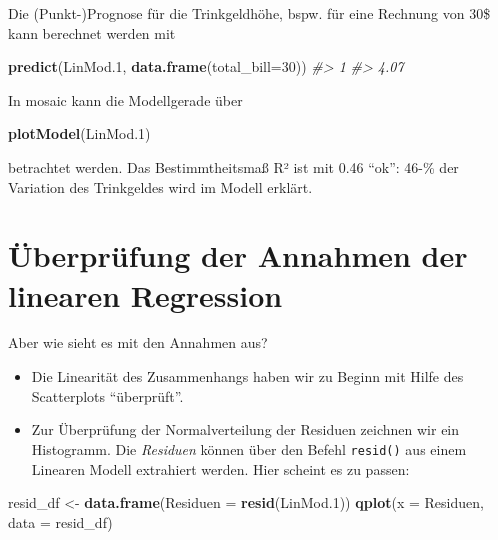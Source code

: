 \documentclass[12pt,ngerman,]{book}
\newenvironment{Shaded}{\begin{snugshade}}{\end{snugshade}}
\newcommand{\KeywordTok}[1]{\textcolor[rgb]{0.13,0.29,0.53}{\textbf{{#1}}}}
\newcommand{\DataTypeTok}[1]{\textcolor[rgb]{0.13,0.29,0.53}{{#1}}}
\newcommand{\DecValTok}[1]{\textcolor[rgb]{0.00,0.00,0.81}{{#1}}}
\newcommand{\FloatTok}[1]{\textcolor[rgb]{0.00,0.00,0.81}{{#1}}}
\newcommand{\StringTok}[1]{\textcolor[rgb]{0.31,0.60,0.02}{{#1}}}
\newcommand{\CommentTok}[1]{\textcolor[rgb]{0.56,0.35,0.01}{\textit{{#1}}}}
\newcommand{\NormalTok}[1]{{#1}}
\providecommand{\tightlist}{%
  \setlength{\itemsep}{0pt}\setlength{\parskip}{0pt}}
\renewenvironment{Shaded}{\begin{kframe}}{\end{kframe}}
\begin{document}
Die (Punkt-)Prognose für die Trinkgeldhöhe, bspw. für eine Rechnung von
30\$ kann berechnet werden mit

\begin{Shaded}
\begin{Highlighting}[]
\KeywordTok{predict}\NormalTok{(LinMod}\FloatTok{.1}\NormalTok{, }\KeywordTok{data.frame}\NormalTok{(}\DataTypeTok{total_bill=}\DecValTok{30}\NormalTok{))}
\CommentTok{#>    1 }
\CommentTok{#> 4.07}
\end{Highlighting}
\end{Shaded}

In mosaic kann die Modellgerade über

\begin{Shaded}
\begin{Highlighting}[]
\KeywordTok{plotModel}\NormalTok{(LinMod}\FloatTok{.1}\NormalTok{)}
\end{Highlighting}
\end{Shaded}

betrachtet werden. Das Bestimmtheitsmaß R² ist mit 0.46 ``ok'': 46-\%
der Variation des Trinkgeldes wird im Modell erklärt.

\section{Überprüfung der Annahmen der linearen
Regression}\label{uberprufung-der-annahmen-der-linearen-regression}

Aber wie sieht es mit den Annahmen aus?

\begin{itemize}
\tightlist
\item
  Die Linearität des Zusammenhangs haben wir zu Beginn mit Hilfe des
  Scatterplots ``überprüft''.
\item
  Zur Überprüfung der Normalverteilung der Residuen zeichnen wir ein
  Histogramm. Die \emph{Residuen} können über den Befehl
  \texttt{resid()} aus einem Linearen Modell extrahiert werden. Hier
  scheint es zu passen:
\end{itemize}

\begin{Shaded}
\begin{Highlighting}[]
\NormalTok{resid_df <-}\StringTok{ }\KeywordTok{data.frame}\NormalTok{(}\DataTypeTok{Residuen =} \KeywordTok{resid}\NormalTok{(LinMod}\FloatTok{.1}\NormalTok{))}
\KeywordTok{qplot}\NormalTok{(}\DataTypeTok{x =} \NormalTok{Residuen, }\DataTypeTok{data =} \NormalTok{resid_df)}
\end{Highlighting}
\end{Shaded}
\end{document}
